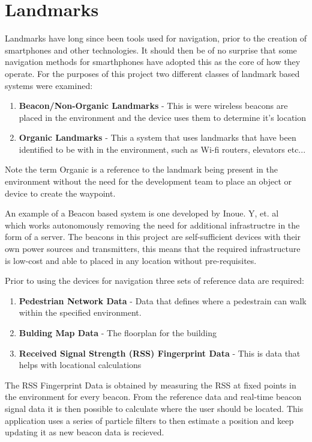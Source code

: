 \documentclass[main.tex]{subfiles}
\begin{document}
\section{Landmarks}

Landmarks have long since been tools used for navigation, prior to the creation of smartphones and other technologies. It should then be of no surprise that some navigation methods for smarthphones have adopted this as the core of how they operate. For the purposes of this project two different classes of landmark based systems were examined:

\begin{enumerate}
	\item \textbf{Beacon/Non-Organic Landmarks} - This is were wireless beacons are placed in the environment and the device uses them to determine it's location
	\item \textbf{Organic Landmarks} - This a system that uses landmarks that have been identified to be with in the environment, such as Wi-fi routers, elevators etc...
\end{enumerate}

Note the term Organic is a reference to the landmark being present in the environment without the need for the development team to place an object or device to create the waypoint.

An example of a Beacon based system is one developed by Inoue. Y, et. al ~\cite{Inoue2009} which works autonomously removing the need for additional infrastructre in the form of a server. The beacons in this project are self-sufficient devices with their own power sources and transmitters, this means that the required infrastructure is low-cost and able to placed in any location without pre-requisites.

Prior to using the devices for navigation three sets of reference data are required:

\begin{enumerate}
	\item \textbf{Pedestrian Network Data} - Data that defines where a pedestrain can walk within the specified environment.
	\item \textbf{Bulding Map Data} - The floorplan for the building
	\item \textbf{Received Signal Strength (RSS) Fingerprint Data} - This is data that helps with locational calculations
\end{enumerate}

The RSS Fingerprint Data is obtained by measuring the RSS at fixed points in the environment for every beacon. From the reference data and real-time beacon signal data it is then possible to calculate where the user should be located. This application uses a series of particle filters to then estimate a position and keep updating it as new beacon data is recieved.
\end{document}
